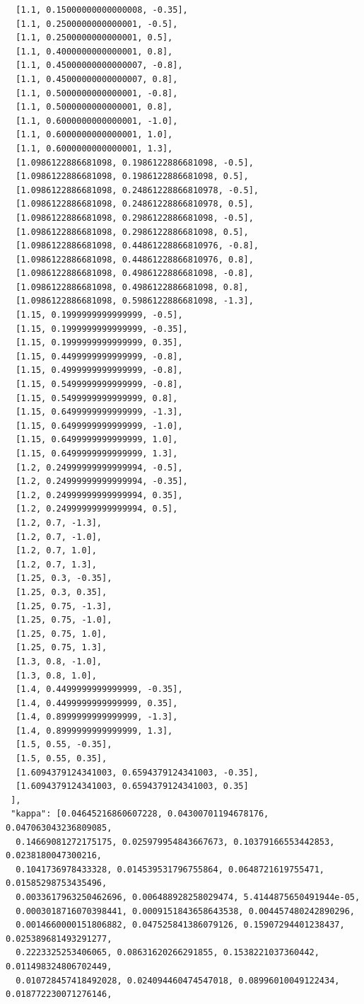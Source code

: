 \documentclass[11pt,reqno]{amsart}
\numberwithin{equation}{section}
\theoremstyle{definition}
\theoremstyle{remark}
\begin{document}
\begin{lstlisting}
  [1.1, 0.15000000000000008, -0.35],
  [1.1, 0.2500000000000001, -0.5],
  [1.1, 0.2500000000000001, 0.5],
  [1.1, 0.4000000000000001, 0.8],
  [1.1, 0.45000000000000007, -0.8],
  [1.1, 0.45000000000000007, 0.8],
  [1.1, 0.5000000000000001, -0.8],
  [1.1, 0.5000000000000001, 0.8],
  [1.1, 0.6000000000000001, -1.0],
  [1.1, 0.6000000000000001, 1.0],
  [1.1, 0.6000000000000001, 1.3],
  [1.0986122886681098, 0.1986122886681098, -0.5],
  [1.0986122886681098, 0.1986122886681098, 0.5],
  [1.0986122886681098, 0.24861228866810978, -0.5],
  [1.0986122886681098, 0.24861228866810978, 0.5],
  [1.0986122886681098, 0.2986122886681098, -0.5],
  [1.0986122886681098, 0.2986122886681098, 0.5],
  [1.0986122886681098, 0.44861228866810976, -0.8],
  [1.0986122886681098, 0.44861228866810976, 0.8],
  [1.0986122886681098, 0.4986122886681098, -0.8],
  [1.0986122886681098, 0.4986122886681098, 0.8],
  [1.0986122886681098, 0.5986122886681098, -1.3],
  [1.15, 0.1999999999999999, -0.5],
  [1.15, 0.1999999999999999, -0.35],
  [1.15, 0.1999999999999999, 0.35],
  [1.15, 0.4499999999999999, -0.8],
  [1.15, 0.4999999999999999, -0.8],
  [1.15, 0.5499999999999999, -0.8],
  [1.15, 0.5499999999999999, 0.8],
  [1.15, 0.6499999999999999, -1.3],
  [1.15, 0.6499999999999999, -1.0],
  [1.15, 0.6499999999999999, 1.0],
  [1.15, 0.6499999999999999, 1.3],
  [1.2, 0.24999999999999994, -0.5],
  [1.2, 0.24999999999999994, -0.35],
  [1.2, 0.24999999999999994, 0.35],
  [1.2, 0.24999999999999994, 0.5],
  [1.2, 0.7, -1.3],
  [1.2, 0.7, -1.0],
  [1.2, 0.7, 1.0],
  [1.2, 0.7, 1.3],
  [1.25, 0.3, -0.35],
  [1.25, 0.3, 0.35],
  [1.25, 0.75, -1.3],
  [1.25, 0.75, -1.0],
  [1.25, 0.75, 1.0],
  [1.25, 0.75, 1.3],
  [1.3, 0.8, -1.0],
  [1.3, 0.8, 1.0],
  [1.4, 0.4499999999999999, -0.35],
  [1.4, 0.4499999999999999, 0.35],
  [1.4, 0.8999999999999999, -1.3],
  [1.4, 0.8999999999999999, 1.3],
  [1.5, 0.55, -0.35],
  [1.5, 0.55, 0.35],
  [1.6094379124341003, 0.6594379124341003, -0.35],
  [1.6094379124341003, 0.6594379124341003, 0.35]
 ],
 "kappa": [0.04645216860607228, 0.04300701194678176, 0.047063043236809085,
  0.14669081272175175, 0.025979954843667673, 0.10379166553442853, 0.0238180047300216,
  0.1041736978433328, 0.014539531796755864, 0.0648721619755471, 0.01585298753435496,
  0.0033617963250462696, 0.006488928258029474, 5.4144875650491944e-05,
  0.0003018716070398441, 0.0009151843658643538, 0.004457480242890296,
  0.0014660000151806882, 0.047525841386079126, 0.15907294401238437, 0.025389681493291277,
  0.2223325253406065, 0.08631620266291855, 0.1538221037360442, 0.011498324806702449,
  0.010728457418492028, 0.024094460474547018, 0.08996010049122434, 0.018772230071276146,

\end{lstlisting}
\end{document}
